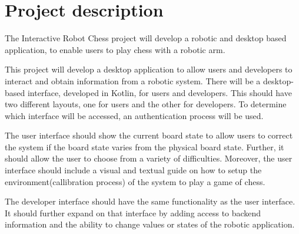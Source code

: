 \documentclass[11pt,fleqn,twoside]{article}
\begin{document}

\mmp

\setcounter{tocdepth}{4} %


\section{Project description}
The Interactive Robot Chess project will develop a robotic and desktop based application, to enable users to 
play chess with a robotic arm.\newline

\noindent This project will develop a desktop application to allow users and developers to interact and obtain 
information from a robotic system. There will be a desktop-based interface, developed in Kotlin\cite{kotlin}, for users 
and developers. This should have two different layouts, one for users and the other for developers. To determine   
which interface will be accessed, an authentication process will be used.\newline

\noindent The user interface should show the current board state to allow users to correct the system if the board 
state varies from the physical board state. Further, it should allow the user to choose from a variety of difficulties. 
Moreover, the user interface should include a visual and textual guide on how to setup the environment(callibration process) 
of the system to play a game of chess.\newline

\noindent The developer interface should have the same functionality as the user interface. It should further expand 
on that interface by adding access to backend information and the ability to change values or states of the robotic 
application.\newline
\end{document}
